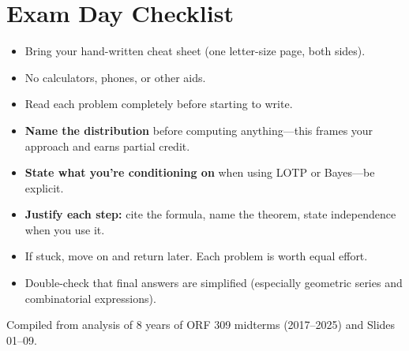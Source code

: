 \documentclass[11pt]{article}
\begin{document}
\section{Exam Day Checklist}

\begin{itemize}
\item Bring your hand-written cheat sheet (one letter-size page, both sides).
\item No calculators, phones, or other aids.
\item Read each problem completely before starting to write.
\item \textbf{Name the distribution} before computing anything---this frames your approach and earns partial credit.
\item \textbf{State what you're conditioning on} when using LOTP or Bayes---be explicit.
\item \textbf{Justify each step:} cite the formula, name the theorem, state independence when you use it.
\item If stuck, move on and return later. Each problem is worth equal effort.
\item Double-check that final answers are simplified (especially geometric series and combinatorial expressions).
\end{itemize}

\vfill
\begin{center}
\small\color{gray} Compiled from analysis of 8 years of ORF 309 midterms (2017--2025) and Slides 01--09.
\end{center}
\end{document}
